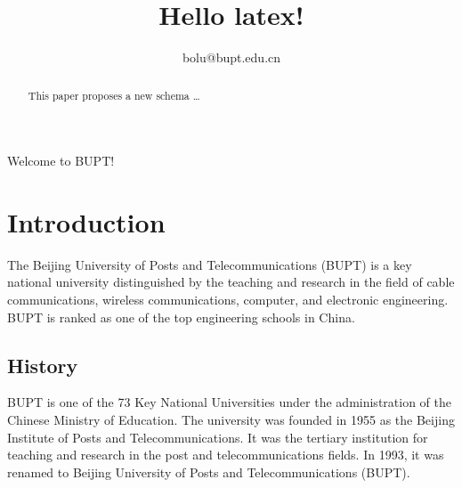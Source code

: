 \documentclass[]{article}
\title{Hello latex!}
\author{bolu@bupt.edu.cn}
\begin{document}
\maketitle
Welcome to BUPT!
\begin{abstract}
This paper proposes a new schema \dots
\end{abstract}

\section{Introduction}
The Beijing University of Posts and Telecommunications (BUPT) is a key national university distinguished by the teaching and research in the field of cable communications, wireless communications, computer, and electronic engineering. BUPT is ranked as one of the top engineering schools in China. 
\subsection{History}
BUPT is one of the 73 Key National Universities under the administration of the Chinese Ministry of Education. The university was founded in 1955 as the Beijing Institute of Posts and Telecommunications. It was the tertiary institution for teaching and research in the post and telecommunications fields. In 1993, it was renamed to Beijing University of Posts and Telecommunications (BUPT).
\end{document}
